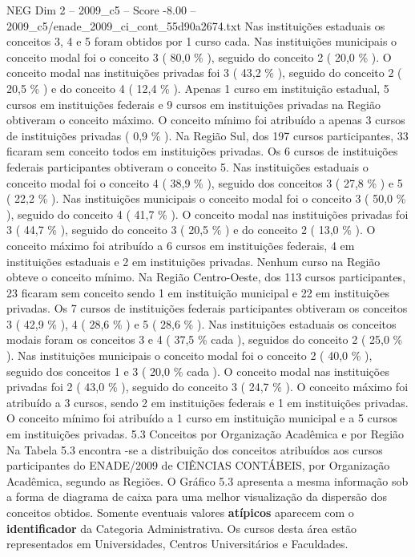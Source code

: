 \begin{textsample}{NEG Dim 2 – 2009\_c5 – Score -8.00 – 2009\_c5/enade\_2009\_ci\_cont\_55d90a2674.txt}
Nas instituições estaduais os conceitos 3, 4 e 5 foram obtidos por 1 curso cada.
Nas instituições municipais o conceito modal foi o conceito 3 ( 80,0 \% ), seguido do conceito 2 ( 20,0 \% ).
O conceito modal nas instituições privadas foi 3 ( 43,2 \% ), seguido do conceito 2 ( 20,5 \% ) e do conceito 4 ( 12,4 \% ).
Apenas 1 curso em instituição estadual, 5 cursos em instituições federais e 9 cursos em instituições privadas na Região obtiveram o conceito máximo.
O conceito mínimo foi atribuído a apenas 3 cursos de instituições privadas ( 0,9 \% ).
Na Região Sul, dos 197 cursos participantes, 33 ficaram sem conceito todos em instituições privadas.
Os 6 cursos de instituições federais participantes obtiveram o conceito 5.
Nas instituições estaduais o conceito modal foi o conceito 4 ( 38,9 \% ), seguido dos conceitos 3 ( 27,8 \% ) e 5 ( 22,2 \% ).
Nas instituições municipais o conceito modal foi o conceito 3 ( 50,0 \% ), seguido do conceito 4 ( 41,7 \% ).
O conceito modal nas instituições privadas foi 3 ( 44,7 \% ), seguido do conceito 3 ( 20,5 \% ) e do conceito 2 ( 13,0 \% ).
O conceito máximo foi atribuído a 6 cursos em instituições federais, 4 em instituições estaduais e 2 em instituições privadas.
Nenhum curso na Região obteve o conceito mínimo.
Na Região Centro-Oeste, dos 113 cursos participantes, 23 ficaram sem conceito sendo 1 em instituição municipal e 22 em instituições privadas.
Os 7 cursos de instituições federais participantes obtiveram os conceitos 3 ( 42,9 \% ), 4 ( 28,6 \% ) e 5 ( 28,6 \% ).
Nas instituições estaduais os conceitos modais foram os conceitos 3 e 4 ( 37,5 \% cada ), seguidos do conceito 2 ( 25,0 \% ).
Nas instituições municipais o conceito modal foi o conceito 2 ( 40,0 \% ), seguido dos conceitos 1 e 3 ( 20,0 \% cada ).
O conceito modal nas instituições privadas foi 2 ( 43,0 \% ), seguido do conceito 3 ( 24,7 \% ).
O conceito máximo foi atribuído a 3 cursos, sendo 2 em instituições federais e 1 em instituições privadas.
O conceito mínimo foi atribuído a 1 curso em instituição municipal e a 5 cursos em instituições privadas. 5.3 Conceitos por Organização Acadêmica e por Região Na Tabela 5.3 encontra -se a distribuição dos conceitos atribuídos aos cursos participantes do ENADE/2009 de CIÊNCIAS CONTÁBEIS, por Organização Acadêmica, segundo as Regiões.
O Gráfico 5.3 apresenta a mesma informação sob a forma de diagrama de caixa para uma melhor visualização da dispersão dos conceitos obtidos.
Somente eventuais valores \textbf{atípicos} aparecem com o \textbf{identificador} da Categoria Administrativa.
Os cursos desta área estão representados em Universidades, Centros Universitários e Faculdades.

\end{textsample}
